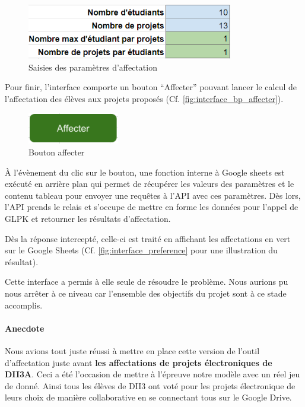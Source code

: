 \documentclass[final,poster]{polytech/polytech}
\begin{document}
\begin{figure}[htbp]
\includegraphics[width=9cm]{images/interface_parametres}
\caption{\label{fig:interface_parametres} Saisies des paramètres d'affectation}
\end{figure}

Pour finir, l’interface comporte un bouton “Affecter” pouvant lancer le calcul de l’affectation des élèves aux projets proposés (Cf. \autoref{fig:interface_bp_affecter}). 

\begin{figure}[htbp]
\includegraphics[width=4cm]{images/interface_bp_affecter}
\caption{\label{fig:interface_bp_affecter} Bouton affecter}
\end{figure}

À l'évènement du clic sur le bouton, une fonction interne à Google sheets est exécuté en arrière plan qui permet de récupérer les valeurs des paramètres et le contenu tableau pour envoyer une requêtes à l’API avec ces paramètres.
Dès lors, l'API prends le relais et s'occupe de mettre en forme les données pour l'appel de GLPK et retourner les résultats d'affectation.

Dès la réponse intercepté, celle-ci est traité en affichant les affectations en vert sur le Google Sheets (Cf. \autoref{fig:interface_preference} pour une illustration du résultat). 

Cette interface a permis à elle seule de résoudre le problème. Nous aurions pu nous arrêter à ce niveau car l'ensemble des objectifs du projet sont à ce stade accomplis.


\paragraph{Anecdote}
\label{anec:affect_proj_elec}
Nous avions tout juste réussi à mettre en place cette version de l'outil d'affectation juste avant \textbf{les affectations de projets électroniques de DII3A}. Ceci a été l'occasion de mettre à l'épreuve notre modèle avec un réel jeu de donné. 
Ainsi tous les élèves de DII3 ont voté pour les projets électronique de leurs choix de manière collaborative en se connectant tous sur le Google Drive. 
\end{document}
